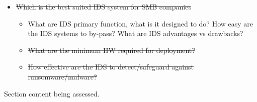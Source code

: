 \begin{notes}


    \begin{itemize}
        \item \sout{Which is the best suited IDS system for SMB companies}
        \begin{itemize}
            \item What are IDS primary function, what is it designed to do? How easy are the IDS systems to by-pass? What are IDS advantages vs drawbacks?
            \item \sout{What are the minimum HW required for deployment?}
            \item \sout{How effective are the IDS to detect/safeguard against ransomware/malware?}
        \end{itemize}

    \end{itemize}
    
    Section content being assessed.

\end{notes}